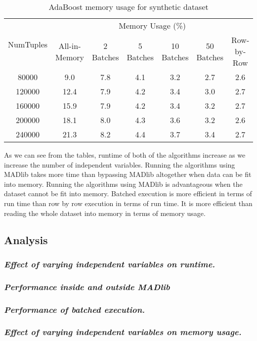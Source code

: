 \begin{table}[!htbp]
\small
\centering
\begin{tabular}{|c|c|c|c|c|c|c|}
\hline
\multirow{2}{*}{NumTuples} & \multicolumn{6}{|c|}{Memory Usage (\%)}\\
\cline{2-7}
& All-in-Memory & 2 Batches & 5 Batches & 10 Batches & 50 Batches & Row-by-Row\\
\hline
80000& 9.0&7.8&4.1 &3.2 &2.7&2.6 \\
\hline
120000& 12.4&7.9 &4.2 &3.4&3.0 &2.7 \\
\hline
160000& 15.9&7.9 &4.2 &3.4 &3.2 &2.7 \\
\hline
200000& 18.1&8.0 &4.3 &3.6 &3.2 &2.6 \\
\hline
240000& 21.3&8.2 &4.4 &3.7 &3.4 &2.7 \\
\hline
\end{tabular}
\caption{AdaBoost memory usage for synthetic dataset}
\label{tab:adaSynth2}
\end{table}

As we can see from the tables, runtime of both of the algorithms increase as we increase the number of independent variables. Running the algorithms using MADlib takes more time than bypassing MADlib altogether when data can be fit into memory. Running the algorithms using MADlib is advantageous when the dataset cannot be fit into memory. Batched execution is more efficient in terms of run time than row by row execution in terms of run time. It is more efficient than reading the whole dataset into memory in terms of memory usage.

\subsection{Analysis}
\subsubsection*{\itshape Effect of varying independent variables on runtime.}

\subsubsection*{\itshape Performance inside and outside MADlib}

\subsubsection*{\itshape Performance of batched execution.}

\subsubsection*{\itshape Effect of varying independent variables on memory usage.}
